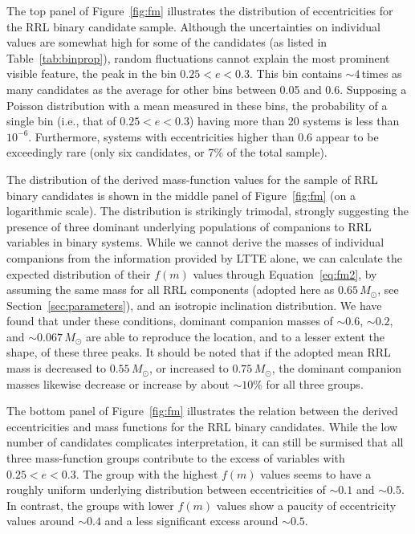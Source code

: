 \documentclass[twocolumn,times]{aastex63}
\begin{document}
The top panel of Figure~\ref{fig:fm} illustrates the distribution of eccentricities for the RRL binary candidate sample.
Although the uncertainties on individual values are somewhat high for some of the candidates (as listed in Table~\ref{tab:binprop}),
random fluctuations cannot explain the most prominent visible feature, the peak in the bin $0.25 < e < 0.3$.
This bin contains $\sim4$\,times as many candidates as the average for other bins between 0.05 and 0.6. Supposing a Poisson
distribution with a mean measured in these bins, the probability of a single bin (i.e., that of $0.25 < e < 0.3$) having more than
20 systems is less than $10^{-6}$.
Furthermore, systems with eccentricities higher than 0.6 appear to be exceedingly rare (only six candidates, or 7\% of the total sample).

The distribution of the derived mass-function values for the sample of RRL binary candidates is shown in the middle panel of
Figure~\ref{fig:fm} (on a logarithmic scale). The distribution is strikingly trimodal, strongly suggesting the presence of three
dominant underlying populations of companions to RRL variables in binary systems.
While we cannot derive the masses of individual companions from the information provided by LTTE alone, we can calculate the expected
distribution of their $f(m)$ values through Equation~\ref{eq:fm2}, by assuming the same mass for all RRL components (adopted here as
$0.65\,M_\odot$, see Section~\ref{sec:parameters}), and an isotropic inclination distribution. We have found that under these conditions,
dominant companion masses of
$\sim0.6$, $\sim0.2$, and $\sim0.067\,M_\odot$ are able to reproduce the location, and to a lesser extent the shape, of
these three peaks. It should be noted that if the adopted mean RRL mass is decreased to $0.55\,M_\odot$, or increased
to $0.75\,M_\odot$, the dominant companion masses likewise decrease or increase by about $\sim10\%$ for all three groups.

The bottom panel of Figure~\ref{fig:fm} illustrates the relation between the derived eccentricities and mass functions for the
RRL binary candidates. While the low number of candidates complicates interpretation, it can still be surmised that all three
mass-function groups contribute to the excess of variables with $0.25<e<0.3$. The group with the
highest $f(m)$ values seems to have  a roughly uniform underlying distribution between eccentricities of $\sim0.1$ and $\sim0.5$.
In contrast, the groups with lower $f(m)$ values show a paucity of eccentricity values around $\sim0.4$ and a less
significant excess around $\sim0.5$.
\end{document}
